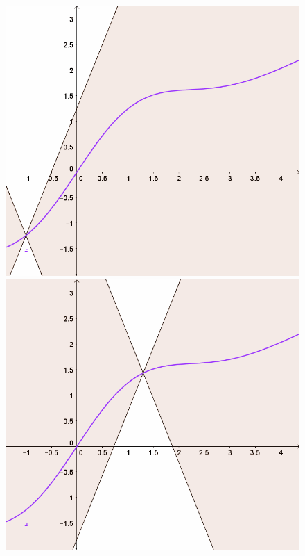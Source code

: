 \documentclass[11pt]{article}
\begin{document}
\begin{figure}[h]
\centering
\begin{minipage}{.33\textwidth}
    \centering
    \includegraphics[width=.9\linewidth]{figure/lip_1.png}
\end{minipage}%
\begin{minipage}{.33\textwidth}
    \centering
    \includegraphics[width=.9\linewidth]{figure/lip_2.png}
\end{minipage}
\begin{minipage}{.33\textwidth}
    \centering

\end{minipage}
\end{figure}
\end{document}
